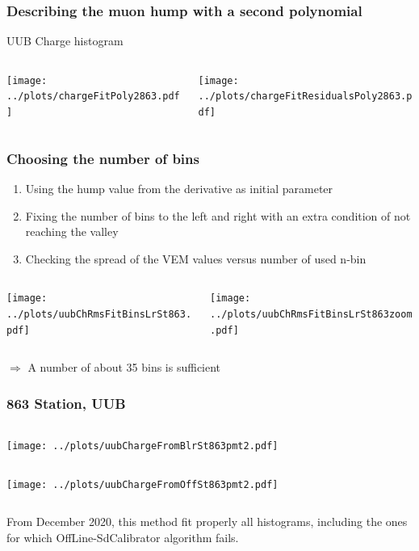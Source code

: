 \documentclass[aspectratio=169]{beamer}
\begin{document}
\begin{frame} 
  \frametitle{Describing the muon hump with a second polynomial}
  UUB Charge histogram
  \begin{columns}
    \begin{column}{0.55\textwidth}
      \texttt{[image: ../plots/chargeFitPoly2863.pdf]}
    \end{column}
    \begin{column}{0.55\textwidth}
      \texttt{[image: ../plots/chargeFitResidualsPoly2863.pdf]}
    \end{column}
  \end{columns}
\end{frame}

\begin{frame} 
  \frametitle{Choosing the number of bins}
  \begin{enumerate}
    \item Using the hump value from the derivative as initial parameter
    \item Fixing the number of bins to the left and right
      with an extra condition of not reaching the valley
    \item Checking the spread of the VEM values versus number
      of used n-bin
  \end{enumerate}
  \begin{center}
    \begin{columns}
      \begin{column}{0.55\textwidth}
        \texttt{[image: ../plots/uubChRmsFitBinsLrSt863.pdf]}
      \end{column}
      \begin{column}{0.55\textwidth}
        \texttt{[image: ../plots/uubChRmsFitBinsLrSt863zoom.pdf]}
      \end{column}
    \end{columns}
  \end{center}
     \hfill $\Rightarrow$ A number of about 35 bins is sufficient 
\end{frame}

\begin{frame} 
  \frametitle{863 Station, UUB}

  \begin{center}
    \begin{columns}
      \begin{column}{0.5\textwidth}
        \texttt{[image: ../plots/uubChargeFromBlrSt863pmt2.pdf]}
      \end{column}
    \end{columns}

    \begin{columns}
      \begin{column}{0.5\textwidth}
        \texttt{[image: ../plots/uubChargeFromOffSt863pmt2.pdf]}
      \end{column}
    \end{columns}
  \end{center}
  From December 2020, this method fit properly all histograms,
  including the ones for which OffLine-SdCalibrator algorithm
  fails.
\end{frame}
\end{document}
